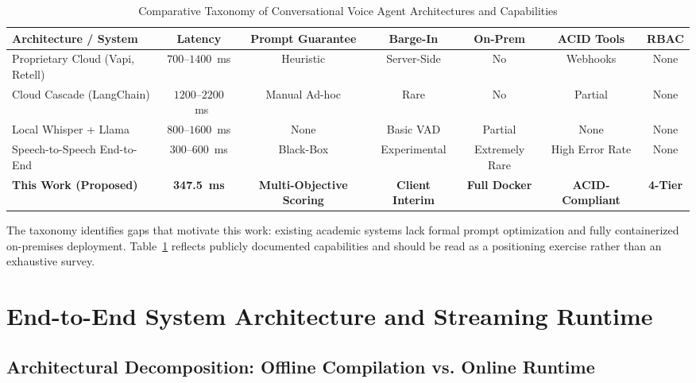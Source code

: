 \documentclass[11pt,a4paper]{article}
\begin{document}
\begin{table}[htbp]
\centering
\small
\caption{Comparative Taxonomy of Conversational Voice Agent Architectures and Capabilities}
\label{tab:literature_taxonomy}
\renewcommand{\arraystretch}{1.25}
\begin{tabularx}{\textwidth}{lcccccc}
\toprule
\textbf{Architecture / System} & \textbf{Latency} & \textbf{Prompt Guarantee} & \textbf{Barge-In} & \textbf{On-Prem} & \textbf{ACID Tools} & \textbf{RBAC} \\
\midrule
Proprietary Cloud (Vapi, Retell) & $700$--$1400$~ms & Heuristic & Server-Side & No & Webhooks & None \\
Cloud Cascade (LangChain) & $1200$--$2200$~ms & Manual Ad-hoc & Rare & No & Partial & None \\
Local Whisper + Llama & $800$--$1600$~ms & None & Basic VAD & Partial & None & None \\
Speech-to-Speech End-to-End & $300$--$600$~ms & Black-Box & Experimental & Extremely Rare & High Error Rate & None \\
\textbf{This Work (Proposed)} & \textbf{347.5~ms} & \textbf{Multi-Objective Scoring} & \textbf{Client Interim} & \textbf{Full Docker} & \textbf{ACID-Compliant} & \textbf{4-Tier} \\
\bottomrule
\end{tabularx}
\end{table}

The taxonomy identifies gaps that motivate this work: existing academic systems lack formal prompt optimization and fully containerized on-premises deployment. Table~\ref{tab:literature_taxonomy} reflects publicly documented capabilities and should be read as a positioning exercise rather than an exhaustive survey.

\section{End-to-End System Architecture and Streaming Runtime}
\label{sec:architecture}

\subsection{Architectural Decomposition: Offline Compilation vs. Online Runtime}
\label{subsec:arch_decomp}
\end{document}

